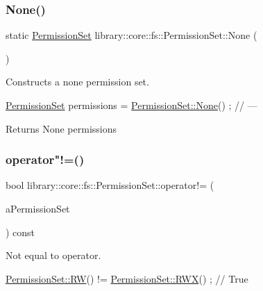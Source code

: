 \subsubsection{\texorpdfstring{None()}{None()}}
{\footnotesize\ttfamily static \hyperlink{classlibrary_1_1core_1_1fs_1_1_permission_set}{Permission\+Set} library\+::core\+::fs\+::\+Permission\+Set\+::\+None (\begin{DoxyParamCaption}{ }\end{DoxyParamCaption})\hspace{0.3cm}{\ttfamily [static]}}



Constructs a none permission set. 


\begin{DoxyCode}
\hyperlink{classlibrary_1_1core_1_1fs_1_1_permission_set_a8a6eb39cc2a8bca92a657d065d3e36ba}{PermissionSet} permissions = \hyperlink{classlibrary_1_1core_1_1fs_1_1_permission_set_af590f297c53ba55474f8d5b78bc45b62}{PermissionSet::None}() ; \textcolor{comment}{// ---}
\end{DoxyCode}


\begin{DoxyReturn}{Returns}
None permissions 
\end{DoxyReturn}
\mbox{\label{classlibrary_1_1core_1_1fs_1_1_permission_set_a7549184997b592bb790ccad3e9084a19}} 
\subsubsection{\texorpdfstring{operator"!=()}{operator!=()}}
{\footnotesize\ttfamily bool library\+::core\+::fs\+::\+Permission\+Set\+::operator!= (\begin{DoxyParamCaption}\item[{const \hyperlink{classlibrary_1_1core_1_1fs_1_1_permission_set}{Permission\+Set} \&}]{a\+Permission\+Set }\end{DoxyParamCaption}) const}



Not equal to operator. 


\begin{DoxyCode}
\hyperlink{classlibrary_1_1core_1_1fs_1_1_permission_set_a9722204cdc11a0171e1a115d449a134b}{PermissionSet::RW}() != \hyperlink{classlibrary_1_1core_1_1fs_1_1_permission_set_afa3f9d07a7053240ae97c587543cdb00}{PermissionSet::RWX}() ; \textcolor{comment}{// True}
\end{DoxyCode}



